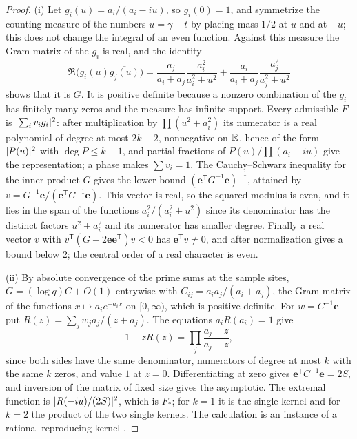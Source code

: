 \begin{proof}
(i) Let $g_i(u)=a_i/(a_i-iu)$, so $g_i(0)=1$, and symmetrize the counting measure of the numbers
$u=\gamma-t$ by placing mass $1/2$ at $u$ and at $-u$; this does not change the integral of an even
function. Against this measure the Gram matrix of the $g_i$ is real, and the identity
\[
 \Re\bigl(g_i(u)\overline{g_j(u)}\bigr)
 =\frac{a_j}{a_i+a_j}\frac{a_i^2}{a_i^2+u^2}+\frac{a_i}{a_i+a_j}\frac{a_j^2}{a_j^2+u^2}
\]
shows that it is $G$. It is positive definite because a nonzero combination of the $g_i$ has finitely
many zeros and the measure has infinite support. Every admissible $F$ is $\lvert\sum_iv_ig_i\rvert^2$: after
multiplication by $\prod(u^2+a_i^2)$ its numerator is a real polynomial of degree at most $2k-2$,
nonnegative on $\mathbb{R}$, hence of the form $\lvert P(u)\rvert^2$ with $\deg P\le k-1$, and partial fractions of
$P(u)/\prod(a_i-iu)$ give the representation; a phase makes $\sum v_i=1$. The Cauchy--Schwarz inequality
for the inner product $G$ gives the lower bound $(\mathbf e^{\mathsf T}G^{-1}\mathbf e)^{-1}$, attained by
$v=G^{-1}\mathbf e/(\mathbf e^{\mathsf T}G^{-1}\mathbf e)$. This vector is real, so the squared modulus is
even, and it lies in the span of the functions $a_i^2/(a_i^2+u^2)$ since its denominator has the distinct
factors $u^2+a_i^2$ and its numerator has smaller degree. Finally a real vector $v$ with
$v^{\mathsf T}(G-2\mathbf e\mathbf e^{\mathsf T})v<0$ has $\mathbf e^{\mathsf T}v\ne0$, and after
normalization gives a bound below $2$; the central order of a real character is even.

(ii) By absolute convergence of the prime sums at the sample sites, $G=(\log q)C+O(1)$ entrywise with
$C_{ij}=a_ia_j/(a_i+a_j)$, the Gram matrix of the functions $x\mapsto a_ie^{-a_ix}$ on $[0,\infty)$, which
is positive definite. For $w=C^{-1}\mathbf e$ put $R(z)=\sum_jw_ja_j/(z+a_j)$. The equations $a_iR(a_i)=1$
give
\[
 1-zR(z)=\prod_j\frac{a_j-z}{a_j+z},
\]
since both sides have the same denominator, numerators of degree at most $k$ with the same $k$ zeros, and
value $1$ at $z=0$. Differentiating at zero gives $\mathbf e^{\mathsf T}C^{-1}\mathbf e=2S$, and inversion
of the matrix of fixed size gives the asymptotic. The extremal function is $\lvert R(-iu)/(2S)\rvert^2$, which is
$F_*$; for $k=1$ it is the single kernel and for $k=2$ the product of the two single kernels. The
calculation is an instance of a rational reproducing kernel \cite{Dzhrbashyan1974Biorthogonal}.


\end{proof}
